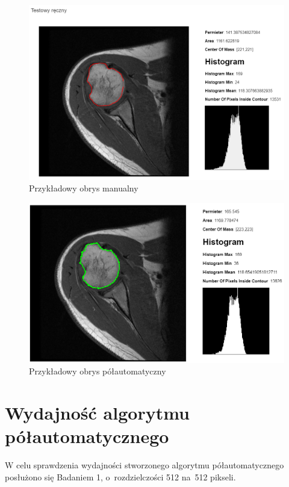 \documentclass[a4paper,11pt,twoside,openright]{report}
\theoremstyle{definition}
\begin{document}
\begin{figure}[p]
	\center
	\includegraphics[width=1\textwidth]{105}
	\caption{Przykładowy obrys manualny}
    	\label{fig:105}
\end{figure}

\begin{figure}[p]
	\center
	\includegraphics[width=1\textwidth]{107}
	\caption{Przykładowy obrys półautomatyczny}
    	\label{fig:107}
\end{figure}



\section {Wydajność algorytmu półautomatycznego}

W celu sprawdzenia wydajności stworzonego algorytmu półautomatycznego posłużono
się Badaniem 1, o~rozdzielczości 512 na~512 pikseli.
\end{document}

